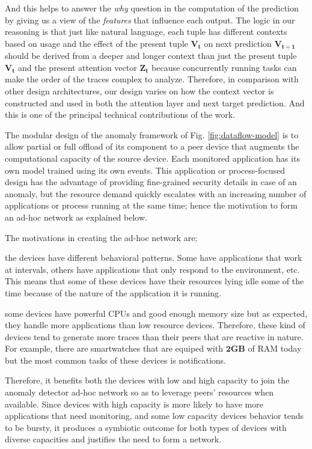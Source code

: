 And this helps to answer the \emph{why} question in the 
computation of the prediction by giving us a view of the 
\emph{features} that 
influence each output. The logic in 
our reasoning is that just like natural language, each tuple 
has different 
contexts based on usage and the effect of the present tuple $ 
\bm{V_t} $ on 
next 
prediction $ \bm{V_{t+1}} $ should be derived from a deeper 
and longer context 
than 
just the present tuple $ \bm{V_t} $ and the present attention 
vector $ \bm{Z_t} 
$ because concurrently running tasks can make the order of 
the traces complex 
to analyze. 
Therefore, in comparison with other design architectures, our 
design varies on 
how the context vector is constructed and used in both the 
attention layer and 
next target prediction. And this is one of the principal 
technical 
contributions of the work. \par
The modular design of the anomaly framework of Fig. 
\ref{fig:dataflow-model} is to allow partial or full offload 
of 
its component to a 
peer device that augments the computational capacity of the 
source device. Each monitored application has its own model 
trained using its own events. This application or 
process-focused design has the advantage of providing 
fine-grained security details in case of an anomaly, but the 
resource demand quickly escalates with an increasing number 
of applications or process running at the same time; hence 
the motivation to form an ad-hoc network as explained below. 
\par 
The motivations in creating the ad-hoc network 
are;
\begin{enumerate*}[label={\alph*)},font={\bfseries}]
	\item the devices have different behavioral patterns. 
	Some have applications that work at intervals, others 
	have applications that only respond to the environment, 
	etc. 
	This means that some of these devices have their 
	resources lying idle some of the time because of the 
	nature of the application it is running.
	\item some devices have powerful CPUs and good enough 
	memory size but as expected, they handle more 
	applications than low resource devices. Therefore, these 
	kind of devices tend to generate more traces than their 
	peers that are reactive in nature. For example, there are 
	smartwatches that are equiped with $ \bm{2GB} $ of RAM 
	today but the most common tasks of these devices is 
	notifications. 
\end{enumerate*}
Therefore, it benefits both the devices with low and high 
capacity to join the anomaly detector ad-hoc network so as to 
leverage peers' 
resources when available. Since devices with high capacity is 
more likely to have more applications that need monitoring, 
and some low capacity devices behavior tends to be bursty, it 
produces a symbiotic outcome for both types of devices with 
diverse capacities and justifies the need to form a 
network.\par


